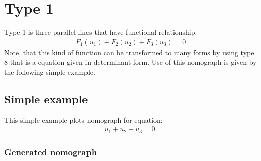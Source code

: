 \documentclass[a4paper,11pt,english]{sphinxmanual}
\begin{document}
\section{Type 1}
\label{\detokenize{types/types:type-1}}\label{\detokenize{types/types:type1-ref}}
Type 1 is three parallel lines that have functional relationship:
\begin{equation*}
\begin{split}F_1(u_1)+F_2(u_2)+F_3(u_3)=0\end{split}
\end{equation*}
Note, that this kind of function can be transformed to many forms by using type 8 that
is a equation given in determinant form. Use of this nomograph is given by the following
simple example.


\subsection{Simple example}
\label{\detokenize{types/types:simple-example}}
This simple example plots nomograph for equation:
\begin{equation*}
\begin{split}u_1 + u_2 + u_3 = 0.\end{split}
\end{equation*}

\subsubsection{Generated nomograph}
\label{\detokenize{types/types:generated-nomograph}}
\noindent{}
\end{document}
